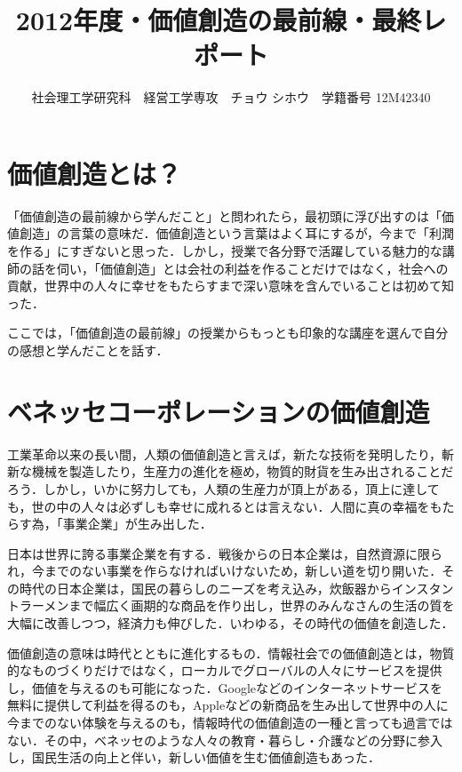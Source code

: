 \documentclass{jsarticle}
\begin{document}
\title{2012年度・価値創造の最前線・最終レポート}
\author{{\normalsize 社会理工学研究科　経営工学専攻　チョウ シホウ　学籍番号 12M42340}}
\date{}
\maketitle

\def \Pr{{\rm Pr}}


\baselineskip 1.5cm

\fontsize{5mm}{9mm}\selectfont

\section{価値創造とは？}
「価値創造の最前線から学んだこと」と問われたら，最初頭に浮び出すのは「価値創造」の言葉の意味だ．価値創造という言葉はよく耳にするが，今まで「利潤を作る」にすぎないと思った．しかし，授業で各分野で活躍している魅力的な講師の話を伺い，「価値創造」とは会社の利益を作ることだけではなく，社会への貢献，世界中の人々に幸せをもたらすまで深い意味を含んでいることは初めて知った．

ここでは，「価値創造の最前線」の授業からもっとも印象的な講座を選んで自分の感想と学んだことを話す．

\section{ベネッセコーポレーションの価値創造}
工業革命以来の長い間，人類の価値創造と言えば，新たな技術を発明したり，斬新な機械を製造したり，生産力の進化を極め，物質的財貨を生み出されることだろう．しかし，いかに努力しても，人類の生産力が頂上がある，頂上に達しても，世の中の人々は必ずしも幸せに成れるとは言えない．人間に真の幸福をもたらす為，「事業企業」が生み出した．

日本は世界に誇る事業企業を有する．戦後からの日本企業は，自然資源に限られ，今までのない事業を作らなければいけないため，新しい道を切り開いた．その時代の日本企業は，国民の暮らしのニーズを考え込み，炊飯器からインスタントラーメンまで幅広く画期的な商品を作り出し，世界のみんなさんの生活の質を大幅に改善しつつ，経済力も伸びした．いわゆる，その時代の価値を創造した．

価値創造の意味は時代とともに進化するもの．情報社会での価値創造とは，物質的なものづくりだけではなく，ローカルでグローバルの人々にサービスを提供し，価値を与えるのも可能になった．Googleなどのインターネットサービスを無料に提供して利益を得るのも，Appleなどの新商品を生み出して世界中の人に今までのない体験を与えるのも，情報時代の価値創造の一種と言っても過言ではない．その中，ベネッセのような人々の教育・暮らし・介護などの分野に参入し，国民生活の向上と伴い，新しい価値を生む価値創造もあった．
\end{document}
